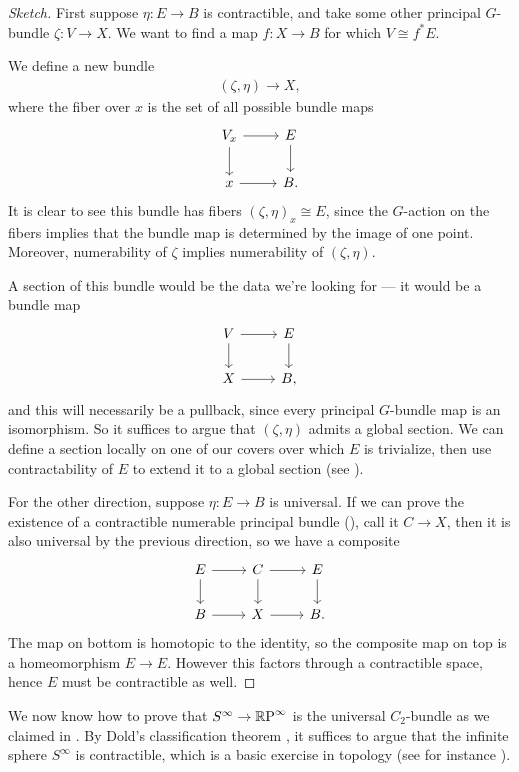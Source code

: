 \documentclass[11pt]{book}
\begin{document}
\begin{proof}[Sketch]
First suppose $\eta \colon E \to B$ is contractible, and take some other principal $G$-bundle $\zeta \colon V \to X$. We want to find a map $f \colon X \to B$ for which $V\cong f^\ast E$.

We define a new bundle
\begin{align*}
    ( \zeta,\eta ) \to X,
\end{align*}
where the fiber over $x$ is the set of all possible bundle maps
\[ \begin{tikzcd}
    V_x\rar\dar & E\dar\\
    x\rar & B.
\end{tikzcd} \]
It is clear to see this bundle has fibers $(\zeta,\eta)_x \cong E$, since the $G$-action on the fibers implies that the bundle map is determined by the image of one point. Moreover, numerability of $\zeta$ implies numerability of $(\zeta,\eta)$.

A section of this bundle would be the data we're looking for --- it would be a bundle map
\[ \begin{tikzcd}
    V\rar\dar & E\dar\\
    X\rar & B,
\end{tikzcd} \]
and this will necessarily be a pullback, since every principal $G$-bundle map is an isomorphism. So it suffices to argue that $(\zeta,\eta)$ admits a global section. We can define a section locally on one of our covers over which $E$ is trivialize, then use contractability of $E$ to extend it to a global section (see \cite[2.6,2.7,2.8]{doldPartitionsUnityTheory1963}).

For the other direction, suppose $\eta \colon E \to B$ is universal. If we can prove the existence of a contractible numerable principal bundle (\cite[\S8]{doldPartitionsUnityTheory1963}), call it $C \to X$, then it is also universal by the previous direction, so we have a composite
\[ \begin{tikzcd}
    E\rar\dar & C\rar\dar & E\dar \\
    B\rar & X\rar & B.
\end{tikzcd} \]
The map on bottom is homotopic to the identity, so the composite map on top is a homeomorphism $E \to E$. However this factors through a contractible space, hence $E$ must be contractible as well.
\end{proof}

\begin{remark}
We now know how to prove that $S^\infty \to {\mathbb{R}\text{P}}^\infty$ is the universal $C_2$-bundle as we claimed in . By Dold's classification theorem , it suffices to argue that the infinite sphere $S^\infty$ is contractible, which is a basic exercise in topology (see for instance \cite[p.~19]{Hatcher}).
\end{remark}
\end{document}
